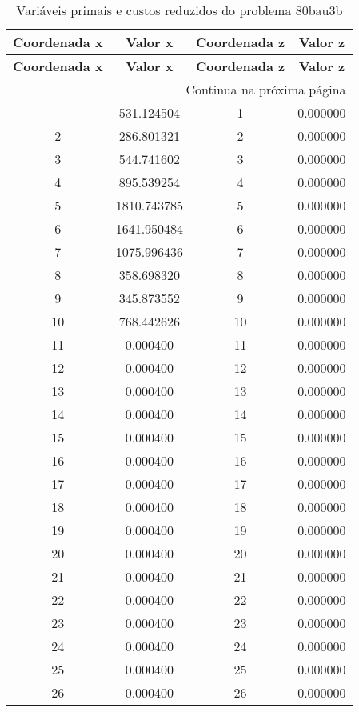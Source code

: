 \documentclass[12pt]{article}
\begin{document}
\begin{longtable}{@{}cccc@{}}
\caption{Variáveis primais e custos reduzidos do problema 80bau3b} \\
\toprule
\textbf{Coordenada x} & \textbf{Valor x} & \textbf{Coordenada z} & \textbf{Valor z} \\
\midrule
\endfirsthead

\toprule
\textbf{Coordenada x} & \textbf{Valor x} & \textbf{Coordenada z} & \textbf{Valor z} \\
\midrule
\endhead

\midrule \multicolumn{4}{r}{{Continua na próxima página}} \\ \midrule
\endfoot

\bottomrule
\endlastfoot
1 & 531.124504 & 1 & 0.000000 \\
2 & 286.801321 & 2 & 0.000000 \\
3 & 544.741602 & 3 & 0.000000 \\
4 & 895.539254 & 4 & 0.000000 \\
5 & 1810.743785 & 5 & 0.000000 \\
6 & 1641.950484 & 6 & 0.000000 \\
7 & 1075.996436 & 7 & 0.000000 \\
8 & 358.698320 & 8 & 0.000000 \\
9 & 345.873552 & 9 & 0.000000 \\
10 & 768.442626 & 10 & 0.000000 \\
11 & 0.000400 & 11 & 0.000000 \\
12 & 0.000400 & 12 & 0.000000 \\
13 & 0.000400 & 13 & 0.000000 \\
14 & 0.000400 & 14 & 0.000000 \\
15 & 0.000400 & 15 & 0.000000 \\
16 & 0.000400 & 16 & 0.000000 \\
17 & 0.000400 & 17 & 0.000000 \\
18 & 0.000400 & 18 & 0.000000 \\
19 & 0.000400 & 19 & 0.000000 \\
20 & 0.000400 & 20 & 0.000000 \\
21 & 0.000400 & 21 & 0.000000 \\
22 & 0.000400 & 22 & 0.000000 \\
23 & 0.000400 & 23 & 0.000000 \\
24 & 0.000400 & 24 & 0.000000 \\
25 & 0.000400 & 25 & 0.000000 \\
26 & 0.000400 & 26 & 0.000000 \\

\end{longtable}
\end{document}
